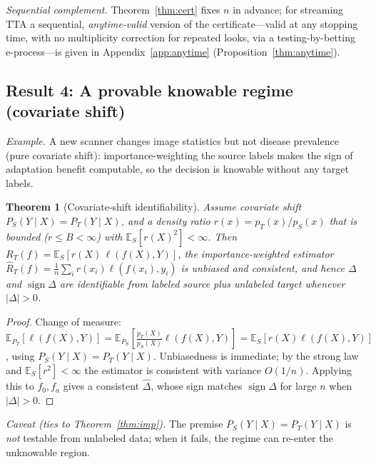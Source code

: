 \documentclass[conference]{IEEEtran}
\theoremstyle{plain}
\newtheorem{theorem}{Theorem}
\theoremstyle{definition}
\newcommand{\E}{\mathbb{E}}
\newcommand{\sign}{\operatorname{sign}}
\begin{document}
\noindent\emph{Sequential complement.} Theorem~\ref{thm:cert} fixes $n$ in advance; for
streaming TTA a sequential, \emph{anytime-valid} version of the certificate---valid at any
stopping time, with no multiplicity correction for repeated looks, via a testing-by-betting
e-process---is given in Appendix~\ref{app:anytime} (Proposition~\ref{thm:anytime}).

\subsection{Result 4: A provable knowable regime (covariate shift)}\label{sec:pos}
\noindent\emph{Example.} A new scanner changes image statistics but not disease prevalence (pure
covariate shift): importance-weighting the source labels makes the sign of adaptation benefit
computable, so the decision is knowable without any target labels.
\begin{theorem}[Covariate-shift identifiability]\label{thm:pos}
Assume covariate shift $P_S(Y\mid X)=P_T(Y\mid X)$, and a density ratio
$r(x)=p_T(x)/p_S(x)$ that is bounded ($r\le B<\infty$) with $\E_S[r(X)^2]<\infty$.
Then $R_T(f)=\E_S[r(X)\,\ell(f(X),Y)]$, the importance-weighted estimator
$\widehat R_T(f)=\tfrac1n\sum_i r(x_i)\ell(f(x_i),y_i)$ is unbiased and consistent, and
hence $\Delta$ and $\sign\Delta$ are identifiable from labeled source plus unlabeled
target whenever $|\Delta|>0$.
\end{theorem}
\begin{proof}
Change of measure: $\E_{P_T}[\ell(f(X),Y)]=\E_{P_S}[\tfrac{p_T(X)}{p_S(X)}\ell(f(X),Y)]
=\E_S[r(X)\ell(f(X),Y)]$, using $P_S(Y\mid X)=P_T(Y\mid X)$. Unbiasedness is immediate;
by the strong law and $\E_S[r^2]<\infty$ the estimator is consistent with variance
$O(1/n)$. Applying this to $f_0,f_a$ gives a consistent $\widehat\Delta$, whose sign
matches $\sign\Delta$ for large $n$ when $|\Delta|>0$. \qedhere
\end{proof}
\noindent\emph{Caveat (ties to Theorem~\ref{thm:imp}).} The premise
$P_S(Y\mid X)=P_T(Y\mid X)$ is \emph{not} testable from unlabeled data; when it fails,
the regime can re-enter the unknowable region.
\end{document}
